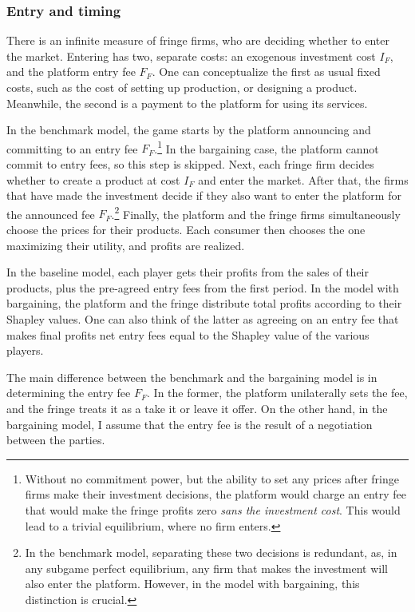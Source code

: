 \documentclass[a4paper]{article}
\begin{document}
\subsubsection{Entry and timing}

There is an infinite measure of fringe firms, who are deciding whether to enter the market.
Entering has two, separate costs: an exogenous investment cost $I_F$, and the platform entry fee $F_F$.
One can conceptualize the first as usual fixed costs, such as the cost of setting up production, or designing a product.
Meanwhile, the second is a payment to the platform for using its services.

In the benchmark model, the game starts by the platform announcing and committing to an entry fee $F_F$.\footnote{
    Without no commitment power, but the ability to set any prices after fringe firms make their investment decisions, the platform would charge an entry fee that would make the fringe profits zero \emph{sans the investment cost}.
    This would lead to a trivial equilibrium, where no firm enters.
}
In the bargaining case, the platform cannot commit to entry fees, so this step is skipped.
Next, each fringe firm decides whether to create a product at cost $I_F$ and enter the market.
After that, the firms that have made the investment decide if they also want to enter the platform for the announced fee $F_F$.\footnote{
    In the benchmark model, separating these two decisions is redundant, as, in any subgame perfect equilibrium, any firm that makes the investment will also enter the platform.
    However, in the model with bargaining, this distinction is crucial.
}
Finally, the platform and the fringe firms simultaneously choose the prices for their products.
Each consumer then chooses the one maximizing their utility, and profits are realized.

In the baseline model, each player gets their profits from the sales of their products, plus the pre-agreed entry fees from the first period.
In the model with bargaining, the platform and the fringe distribute total profits according to their Shapley values.
One can also think of the latter as agreeing on an entry fee that makes final profits net entry fees equal to the Shapley value of the various players.

The main difference between the benchmark and the bargaining model is in determining the entry fee $F_F$.
In the former, the platform unilaterally sets the fee, and the fringe treats it as a take it or leave it offer.
On the other hand, in the bargaining model, I assume that the entry fee is the result of a negotiation between the parties.
\end{document}
